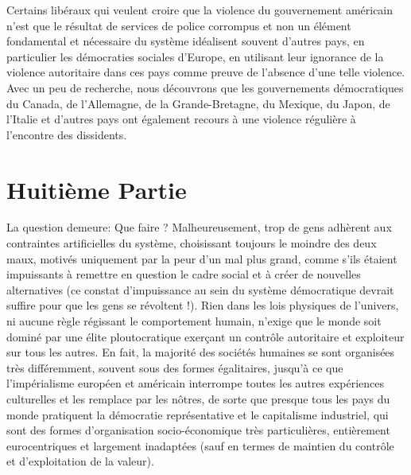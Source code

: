 Certains libéraux qui veulent croire que la violence du gouvernement américain n'est que le résultat de services de police corrompus et non un élément fondamental et nécessaire du système idéalisent souvent d'autres pays, en particulier les démocraties sociales d'Europe, en utilisant leur ignorance de la violence autoritaire dans ces pays comme preuve de l'absence d'une telle violence. Avec un peu de recherche, nous découvrons que les gouvernements démocratiques du Canada, de l'Allemagne, de la Grande-Bretagne, du Mexique, du Japon, de l'Italie et d'autres pays ont également recours à une violence régulière à l'encontre des dissidents.

\chapter*{\textbf{Huitième Partie}}

La question demeure: Que faire ? Malheureusement, trop de gens adhèrent aux contraintes artificielles du système, choisissant toujours le moindre des deux maux, motivés uniquement par la peur d’un mal plus grand, comme s'ils étaient impuissants à remettre en question le cadre social et à créer de nouvelles alternatives (ce constat d'impuissance au sein du système démocratique devrait suffire pour que les gens se révoltent !). Rien dans les lois physiques de l'univers, ni aucune règle régissant le comportement humain, n'exige que le monde soit dominé par une élite ploutocratique exerçant un contrôle autoritaire et exploiteur sur tous les autres. En fait, la majorité des sociétés humaines se sont organisées très différemment, souvent sous des formes égalitaires, jusqu'à ce que l'impérialisme européen et américain interrompe toutes les autres expériences culturelles et les remplace par les nôtres, de sorte que presque tous les pays du monde pratiquent la démocratie représentative et le capitalisme industriel, qui sont des formes d'organisation socio-économique très particulières, entièrement eurocentriques et largement inadaptées (sauf en termes de maintien du contrôle et d'exploitation de la valeur).

